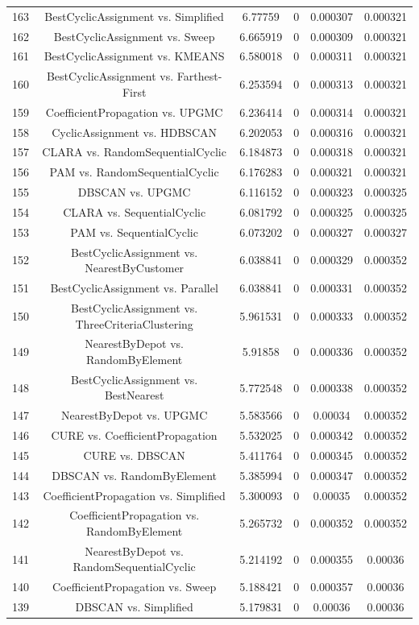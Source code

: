 \documentclass[a4paper,10pt]{article}
\begin{document}
\begin{landscape}
\begin{table}[!htp]
\begin{tabular}{cccccc}
163&BestCyclicAssignment vs. Simplified&6.77759&0&0.000307&0.000321\\
162&BestCyclicAssignment vs. Sweep&6.665919&0&0.000309&0.000321\\
161&BestCyclicAssignment vs. KMEANS&6.580018&0&0.000311&0.000321\\
160&BestCyclicAssignment vs. Farthest-First&6.253594&0&0.000313&0.000321\\
159&CoefficientPropagation vs. UPGMC&6.236414&0&0.000314&0.000321\\
158&CyclicAssignment vs. HDBSCAN&6.202053&0&0.000316&0.000321\\
157&CLARA vs. RandomSequentialCyclic&6.184873&0&0.000318&0.000321\\
156&PAM vs. RandomSequentialCyclic&6.176283&0&0.000321&0.000321\\
155&DBSCAN vs. UPGMC&6.116152&0&0.000323&0.000325\\
154&CLARA vs. SequentialCyclic&6.081792&0&0.000325&0.000325\\
153&PAM vs. SequentialCyclic&6.073202&0&0.000327&0.000327\\
152&BestCyclicAssignment vs. NearestByCustomer&6.038841&0&0.000329&0.000352\\
151&BestCyclicAssignment vs. Parallel&6.038841&0&0.000331&0.000352\\
150&BestCyclicAssignment vs. ThreeCriteriaClustering&5.961531&0&0.000333&0.000352\\
149&NearestByDepot vs. RandomByElement&5.91858&0&0.000336&0.000352\\
148&BestCyclicAssignment vs. BestNearest&5.772548&0&0.000338&0.000352\\
147&NearestByDepot vs. UPGMC&5.583566&0&0.00034&0.000352\\
146&CURE vs. CoefficientPropagation&5.532025&0&0.000342&0.000352\\
145&CURE vs. DBSCAN&5.411764&0&0.000345&0.000352\\
144&DBSCAN vs. RandomByElement&5.385994&0&0.000347&0.000352\\
143&CoefficientPropagation vs. Simplified&5.300093&0&0.00035&0.000352\\
142&CoefficientPropagation vs. RandomByElement&5.265732&0&0.000352&0.000352\\
141&NearestByDepot vs. RandomSequentialCyclic&5.214192&0&0.000355&0.00036\\
140&CoefficientPropagation vs. Sweep&5.188421&0&0.000357&0.00036\\
139&DBSCAN vs. Simplified&5.179831&0&0.00036&0.00036\\

\end{tabular}
\end{table}
\end{landscape}
\end{document}
